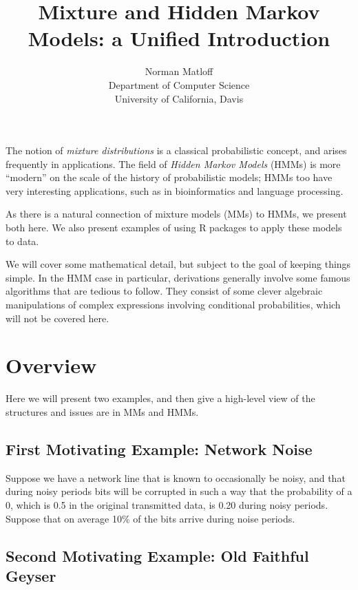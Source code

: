 \documentclass[11pt]{article}
\begin{document}
 

\title{Mixture and Hidden Markov Models: a Unified Introduction}
\author{Norman Matloff \\
   Department of Computer Science \\
   University of California, Davis}

\maketitle

The notion of \textit{mixture distributions} is a classical
probabilistic concept, and arises frequently in applications.  The field
of \textit{Hidden Markov Models} (HMMs) is more ``modern'' on the scale
of the history of probabilistic models; HMMs too have very interesting
applications, such as in bioinformatics and language processing.

As there is a natural connection of mixture models (MMs) to HMMs, we
present both here.  We also present examples of using R packages to
apply these models to data.

We will cover some mathematical detail, but subject to the goal of
keeping things simple.  In the HMM case in particular, derivations
generally involve some famous algorithms that are tedious to follow.
They consist of some clever algebraic manipulations of complex
expressions involving conditional probabilities, which will not be
covered here.

\section{Overview}

Here we will present two examples, and then give a high-level view of
the structures and issues are in MMs and HMMs.

\subsection{First Motivating Example:  Network Noise}

Suppose we have a network line that is known to occasionally be
noisy, and that during noisy periods bits will be corrupted in such
a way that the probability of a 0, which is 0.5 in the original
transmitted data, is 0.20 during noisy periods.  Suppose that on average
10\% of the bits arrive during noise periods.

\subsection{Second Motivating Example:  Old Faithful Geyser}
\end{document}
